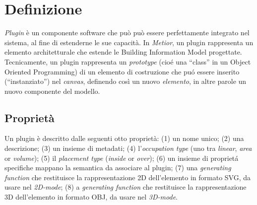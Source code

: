 \section{Definizione}
\label{sec:chapter_3_section_1}

\emph{Plugin} \`e un componente software che pu\`o può essere perfettamente integrato nel sistema, al fine di estenderne le sue capacit\`a.
In \emph{Metior}, un plugin rappresenta un elemento architetturale che estende le Building Information Model progettate.
Tecnicamente, un plugin rappresenta un \emph{prototype} (cio\'e una ``class'' in un Object Oriented Programming) di un elemento di
costruzione che pu\'o essere inserito (``instanziato'') nel \emph{canvas}, definendo cos\`i un nuovo \emph{elemento}, in altre parole
un nuovo componente del modello.
\newpage


\subsection*{Proprietà}

\noindent
Un plugin \`e descritto dalle seguenti otto propriet\`a: (1) un nome unico; (2) una descrizione; (3) un insieme di metadati;
(4) l'\emph{occupation type} (uno tra \emph{linear}, \emph{area} or \emph{volume}); (5) il \emph{placement type} (\emph{inside} or \emph{over});
(6) un insieme di propriet\'a specifiche mappano la semantica da associare al plugin;
(7) una \emph{generating function} che restituisce la rappresentazione 2D dell'elemento in formato SVG, da usare nel \emph{2D-mode};
(8) a \emph{generating function} che restituisce la rappresentazione 3D dell'elemento in formato OBJ, da usare nel  \emph{3D-mode}.

